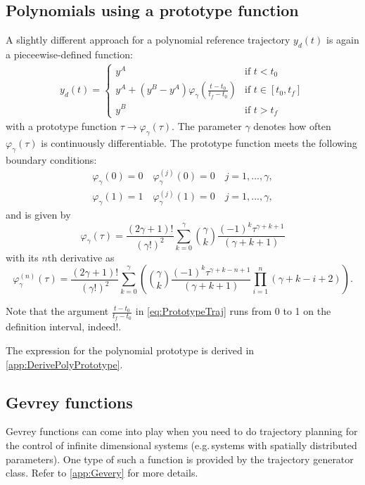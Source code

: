 \documentclass[a4paper,12pt,headinclude=true,headsepline,parskip=half,DIV=12]{scrartcl}
\begin{document}
\subsection{Polynomials using a prototype function}
A slightly different approach for a polynomial reference trajectory $y_d(t)$ is again a pieceewise-defined function:
\begin{align}
  \label{eq:PrototypeTraj}
  y_d(t) =
  \begin{cases}
    y^A                                                             & \textrm{if } t<t_0            \\
    y^A + (y^B-y^A)\varphi_\gamma\left(\frac{t-t_0}{t_f-t_0}\right) & \textrm{if } t \in [t_0, t_f] \\
    y^B                                                             & \textrm{if } t>t_f
  \end{cases}
\end{align}
with a prototype function $\tau \rightarrow \varphi_\gamma(\tau)$. The parameter $\gamma$ denotes  how often $\varphi_\gamma(\tau)$ is continuously differentiable. The prototype function meets  the following boundary conditions:
\begin{align}
  \varphi_\gamma(0)=0 \quad \varphi^{(j)}_\gamma(0)=0 \quad j = 1,...,\gamma, \\
  \varphi_\gamma(1)=1 \quad \varphi^{(j)}_\gamma(1)=0 \quad j = 1,...,\gamma,
\end{align}
and is given by
\begin{equation}
  \varphi_\gamma(\tau)= \frac{(2\gamma+1)!}{(\gamma!)^2} \sum_{k=0}^{\gamma} \binom{\gamma}{k} \frac{(-1)^k\tau^{\gamma+k+1}}{(\gamma+k+1)}
\end{equation}
with its $n$th derivative as
\begin{equation}
  \varphi_\gamma^{(n)}(\tau)= \frac{(2\gamma+1)!}{(\gamma!)^2} \sum_{k=0}^{\gamma} \left(\binom{\gamma}{k} \frac{(-1)^k\tau^{\gamma+k-n+1}}{(\gamma+k+1)}\prod_{i=1}^n(\gamma+k-i+2)\right).
\end{equation}

Note that the argument $\frac{t-t_0}{t_f-t_0}$ in \autoref{eq:PrototypeTraj} runs from 0 to 1 on the definition interval, indeed!.

The expression for the polynomial prototype is derived in \autoref{app:DerivePolyPrototype}.


\subsection{Gevrey functions} \label{sec:Gevrey}
Gevrey functions can come into play when you need to do trajectory planning for the control of infinite dimensional systems (e.g.\,systems with spatially distributed parameters). One type of such a function is provided by the trajectory generator class. Refer to \autoref{app:Gevery} for more details.
\end{document}
